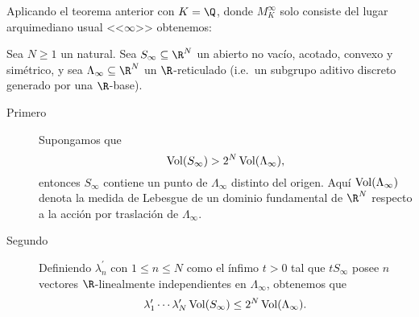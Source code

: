 \documentclass[teoria-numeros.tex]{subfiles}
\begin{document}
Aplicando el teorema anterior con $K = \Q$, donde $M_K^\infty$ solo consiste del lugar arquimediano usual <<$\infty$>> obtenemos:
\begin{thmi}
	Sea $N \ge 1$ un natural.
	Sea $S_\infty \subseteq \R^N$ un abierto no vacío, acotado, convexo y simétrico, y sea $\Lambda_\infty \subseteq \R^N$ un $\R$-reticulado
	(i.e.\ un subgrupo aditivo discreto generado por una $\R$-base).
	\begin{description}
		\item[\thmstyle Primero] Supongamos que
			$$ \operatorname{Vol}(S_\infty) > 2^N \operatorname{Vol}(\Lambda_\infty), $$
			entonces $S_\infty$ contiene un punto de $\Lambda_\infty$ distinto del origen.
			Aquí $\operatorname{Vol}(\Lambda_\infty)$ denota la medida de Lebesgue de un dominio fundamental de $\R^N$
			respecto a la acción por traslación de $\Lambda_\infty$.\footnotemark
		\item[\thmstyle Segundo] Definiendo $\lambda_n^\prime$ con $1 \le n \le N$ como el ínfimo $t > 0$ tal que $tS_\infty$
			posee $n$ vectores $\R$-linealmente independientes en $\Lambda_\infty$, obtenemos que
			$$ \lambda_1^\prime \cdots \lambda_N^\prime \operatorname{Vol}(S_\infty) \le 2^N \operatorname{Vol}(\Lambda_\infty). $$
	\end{description}
\end{thmi}


\end{document}
